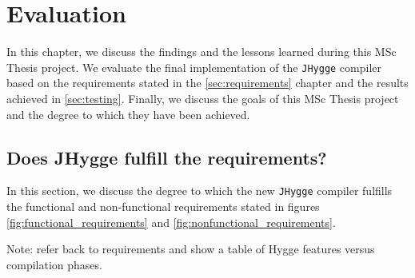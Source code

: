 \chapter{Evaluation}

In this chapter, we discuss the findings and the lessons learned during this MSc Thesis project. We evaluate the final implementation
of the \texttt{JHygge} compiler based on the requirements stated in the \ref{sec:requirements} chapter and the results achieved in
\ref{sec:testing}. Finally, we discuss the goals of this MSc Thesis project and the degree to which they have been achieved.

\section{Does JHygge fulfill the requirements?}

In this section, we discuss the degree to which the new \texttt{JHygge} compiler fulfills the functional and non-functional requirements
stated in figures \ref{fig:functional_requirements} and \ref{fig:nonfunctional_requirements}.

Note: refer back to requirements and show a table of Hygge features versus compilation phases.

